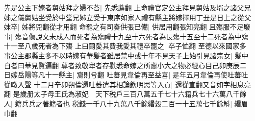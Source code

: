 先是公主下嫁者舅姑拜之婦不荅|{
	先悉薦翻}
上命禮官定公主拜見舅姑及壻之諸父兄姊之儀舅姑坐受於中堂兄姊立受于東序如家人禮有縣主將嫁擇用丁丑是日上之從父妺卒|{
	姊將兕翻從才用翻}
命罷之有司奏供張已備|{
	供居用翻張知亮翻}
且殤服不足廢事|{
	殤音傷說文未成人而死者為殤禮十九至十六死者為長殤十五至十二死者為中殤十一至八歲死者為下殤}
上曰爾愛其費我愛其禮卒罷之|{
	卒子恤翻}
至德以來國家多事公主郡縣主多不以時嫁有華髪者雖居禁中或十年不見天子上始引見諸宗女|{
	髪中白者曰華見賢遍翻}
尊者致敬卑者存慰悉命嫁之所齎小大之物必經心目己卯庚辰二日嫁岳陽等凡十一縣主|{
	齎則兮翻}
吐蕃見韋倫再至益喜|{
	是年五月韋倫再使吐蕃吐從暾入聲}
十二月辛卯朔倫還吐蕃遣其相論欽明思等入貢|{
	還從宣翻又音如字相息亮翻}
是歲册太子母王氏為淑妃　天下税戶三百八萬五千七十六籍兵七十六萬八千餘人|{
	籍兵兵之著籍者也}
税錢一千八十九萬八千餘緡穀二百一十五萬七千餘斛|{
	緡眉巾翻}


